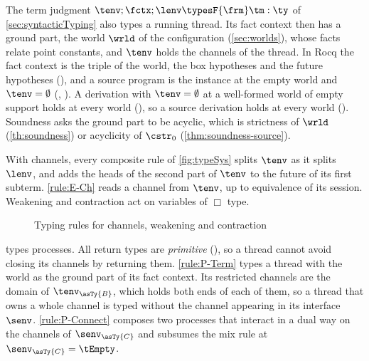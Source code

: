 The term judgment $\tenv ; \fctx ; \lenv \typesF{\frm} \tm : \ty$ of
\cref{sec:syntacticTyping} also types a running thread. Its fact context
then has a ground part, the world $\wrld$ of the configuration
(\cref{sec:worlds}), whose facts relate point constants, and $\tenv$ holds
the channels of the thread. In Rocq the fact context is the triple of the
world, the box hypotheses and the future hypotheses (), and a
source program is the instance at the empty world and $\tenv = \emptyset$
(, ). A derivation with $\tenv = \emptyset$ at a
well-formed world of empty support holds at every world
(), so a source derivation holds at every
world (). Soundness asks the
ground part to be acyclic, which is strictness of $\wrld$
(\cref{th:soundness}) or acyclicity of $\cstr_0$
(\cref{thm:soundness-source}).

With channels, every composite rule of
\cref{fig:typeSys} splits $\tenv$ as it splits $\lenv$, and adds the
heads of the second part of $\tenv$ to the future of its first subterm.
\ref{rule:E-Ch} reads a channel from $\tenv$, up to equivalence of its
session. Weakening
and contraction act on variables of $\Box$ type.

\begin{figure}[tp]
  \adjustfigure[]
  \caption{Typing rules for channels, weakening and contraction}
  \label{fig:typeSysStruct}
\end{figure}

 types processes. All return types are
\emph{primitive} (), so a thread cannot avoid closing its
channels by returning them. \ref{rule:P-Term} types a thread with the
world as the ground part of its fact context. Its restricted channels are
the domain of $\tenv_{\asTy{B}}$, which holds both ends of each of them,
so a thread that owns a whole channel is typed without the channel
appearing in its interface $\senv$. \ref{rule:P-Connect} composes two
processes that interact in a dual way on the channels of
$\senv_{\asTy{C}}$ and subsumes the mix rule at
$\senv_{\asTy{C}} = \tEmpty$.

